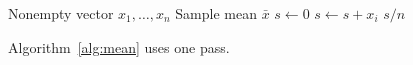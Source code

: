 \documentclass{article}
\begin{document}
\begin{algorithm}
\caption{Compute a sample mean}\label{alg:mean}
\begin{algorithmic}[1]
\Require Nonempty vector $x_1,\ldots,x_n$
\Ensure Sample mean $\bar x$
\State $s\gets 0$
\State $s\gets s+x_i$\EndFor
\State \Return $s/n$
\end{algorithmic}
\end{algorithm}
Algorithm~\ref{alg:mean} uses one pass.
\end{document}
